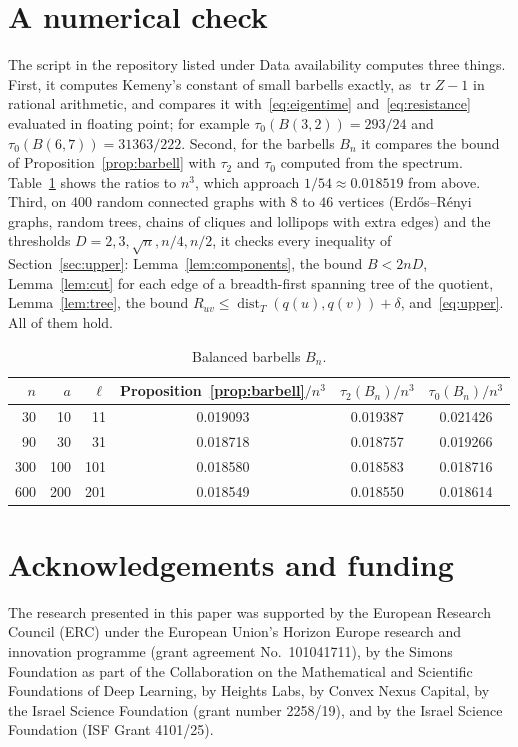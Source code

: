 \documentclass[11pt]{amsart}
\theoremstyle{definition}
\theoremstyle{remark}
\numberwithin{equation}{section}
\DeclareMathOperator{\dist}{dist}
\DeclareMathOperator{\tr}{tr}
\begin{document}
\section{A numerical check}\label{sec:numerics}

The script in the repository listed under Data availability computes three things. First, it computes Kemeny's constant of small barbells exactly, as $\tr Z-1$ in rational arithmetic, and compares it with~\eqref{eq:eigentime} and~\eqref{eq:resistance} evaluated in floating point; for example $\tau_0(B(3,2))=293/24$ and $\tau_0(B(6,7))=31363/222$. Second, for the barbells $B_n$ it compares the bound of Proposition~\ref{prop:barbell} with $\tau_2$ and $\tau_0$ computed from the spectrum. Table~\ref{tab:barbell} shows the ratios to $n^3$, which approach $1/54\approx0.018519$ from above. Third, on $400$ random connected graphs with $8$ to $46$ vertices (Erd\H{o}s--R\'enyi graphs, random trees, chains of cliques and lollipops with extra edges) and the thresholds $D=2,3,\sqrt n,n/4,n/2$, it checks every inequality of Section~\ref{sec:upper}: Lemma~\ref{lem:components}, the bound $B<2nD$, Lemma~\ref{lem:cut} for each edge of a breadth-first spanning tree of the quotient, Lemma~\ref{lem:tree}, the bound $R_{uv}\le\dist_T(q(u),q(v))+\delta$, and~\eqref{eq:upper}. All of them hold.

\begin{table}[ht]
\centering
\begin{tabular}{rrrccc}
\toprule
$n$ & $a$ & $\ell$ & Proposition~\ref{prop:barbell}$/n^3$ & $\tau_2(B_n)/n^3$ & $\tau_0(B_n)/n^3$\\
\midrule
30 & 10 & 11 & 0.019093 & 0.019387 & 0.021426\\
90 & 30 & 31 & 0.018718 & 0.018757 & 0.019266\\
300 & 100 & 101 & 0.018580 & 0.018583 & 0.018716\\
600 & 200 & 201 & 0.018549 & 0.018550 & 0.018614\\
\bottomrule
\end{tabular}
\caption{Balanced barbells $B_n$.}\label{tab:barbell}
\end{table}

\section*{Acknowledgements and funding}
The research presented in this paper was supported by the European Research
Council (ERC) under the European Union's Horizon Europe research and
innovation programme (grant agreement No.~101041711), by the Simons
Foundation as part of the Collaboration on the Mathematical and Scientific
Foundations of Deep Learning, by Heights Labs, by Convex Nexus Capital, by
the Israel Science Foundation (grant number 2258/19), and by the Israel
Science Foundation (ISF Grant 4101/25).
\end{document}
